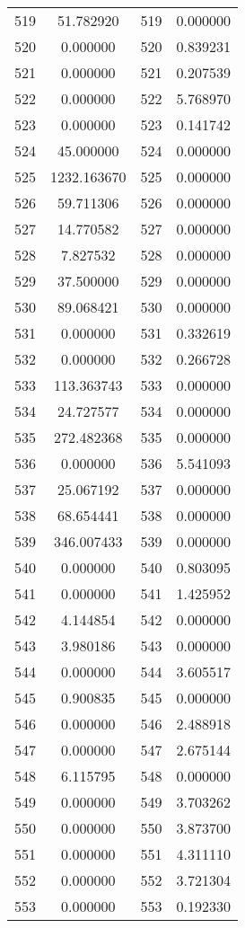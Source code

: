 \documentclass[12pt]{article}
\begin{document}
\begin{longtable}{@{}cccc@{}}
519 & 51.782920 & 519 & 0.000000 \\
520 & 0.000000 & 520 & 0.839231 \\
521 & 0.000000 & 521 & 0.207539 \\
522 & 0.000000 & 522 & 5.768970 \\
523 & 0.000000 & 523 & 0.141742 \\
524 & 45.000000 & 524 & 0.000000 \\
525 & 1232.163670 & 525 & 0.000000 \\
526 & 59.711306 & 526 & 0.000000 \\
527 & 14.770582 & 527 & 0.000000 \\
528 & 7.827532 & 528 & 0.000000 \\
529 & 37.500000 & 529 & 0.000000 \\
530 & 89.068421 & 530 & 0.000000 \\
531 & 0.000000 & 531 & 0.332619 \\
532 & 0.000000 & 532 & 0.266728 \\
533 & 113.363743 & 533 & 0.000000 \\
534 & 24.727577 & 534 & 0.000000 \\
535 & 272.482368 & 535 & 0.000000 \\
536 & 0.000000 & 536 & 5.541093 \\
537 & 25.067192 & 537 & 0.000000 \\
538 & 68.654441 & 538 & 0.000000 \\
539 & 346.007433 & 539 & 0.000000 \\
540 & 0.000000 & 540 & 0.803095 \\
541 & 0.000000 & 541 & 1.425952 \\
542 & 4.144854 & 542 & 0.000000 \\
543 & 3.980186 & 543 & 0.000000 \\
544 & 0.000000 & 544 & 3.605517 \\
545 & 0.900835 & 545 & 0.000000 \\
546 & 0.000000 & 546 & 2.488918 \\
547 & 0.000000 & 547 & 2.675144 \\
548 & 6.115795 & 548 & 0.000000 \\
549 & 0.000000 & 549 & 3.703262 \\
550 & 0.000000 & 550 & 3.873700 \\
551 & 0.000000 & 551 & 4.311110 \\
552 & 0.000000 & 552 & 3.721304 \\
553 & 0.000000 & 553 & 0.192330 \\

\end{longtable}
\end{document}
